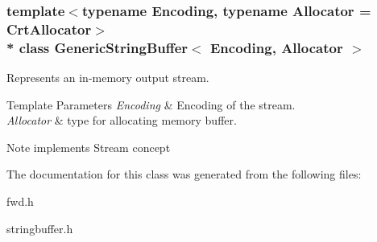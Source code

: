 \subsubsection*{template$<$typename Encoding, typename Allocator = Crt\+Allocator$>$\\*
class Generic\+String\+Buffer$<$ Encoding, Allocator $>$}

Represents an in-\/memory output stream. 


\begin{DoxyTemplParams}{Template Parameters}
{\em Encoding} & Encoding of the stream. \\
\hline
{\em Allocator} & type for allocating memory buffer. \\
\hline
\end{DoxyTemplParams}
\begin{DoxyNote}{Note}
implements Stream concept 
\end{DoxyNote}


The documentation for this class was generated from the following files\+:\begin{DoxyCompactItemize}
\item 
fwd.\+h\item 
stringbuffer.\+h\end{DoxyCompactItemize}
